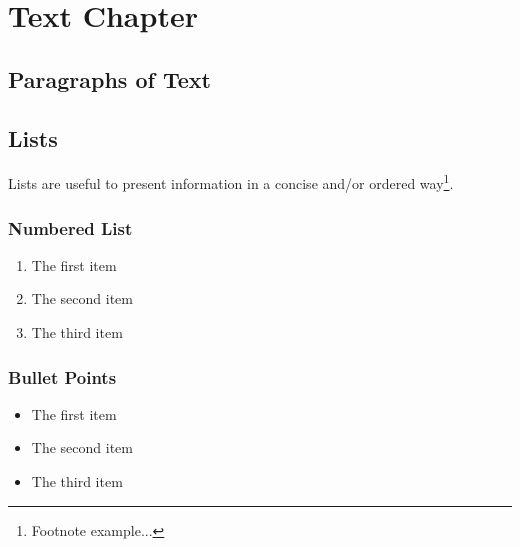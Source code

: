 \documentclass[11pt,fleqn,oneside,openany]{book} %
\begin{document}

\chapter{Text Chapter}

\section{Paragraphs of Text}

\lipsum[1-7] %





\section{Lists}

Lists are useful to present information in a concise and/or ordered way\footnote{Footnote example...}.

\subsection{Numbered List}

\begin{enumerate}
\item The first item
\item The second item
\item The third item
\end{enumerate}

\subsection{Bullet Points}

\begin{itemize}
\item The first item
\item The second item
\item The third item
\end{itemize}
\end{document}
